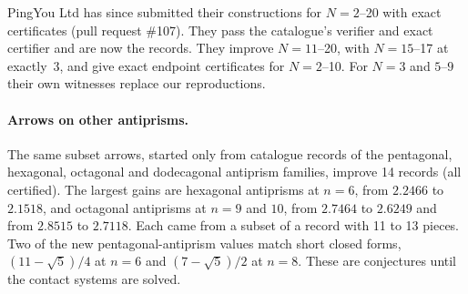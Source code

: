 \documentclass[11pt,a4paper]{article}
\theoremstyle{definition}
\theoremstyle{remark}
\begin{document}
PingYou Ltd has since submitted their constructions for $N=2$--20 with exact certificates (pull request \#107). They pass the catalogue's verifier and exact certifier and are now the records. They improve $N=11$--20, with $N=15$--17 at exactly~3, and give exact endpoint certificates for $N=2$--10. For $N=3$ and $5$--$9$ their own witnesses replace our reproductions.

\paragraph{Arrows on other antiprisms.} The same subset arrows, started only from catalogue records of the pentagonal, hexagonal, octagonal and dodecagonal antiprism families, improve 14 records (all certified). The largest gains are hexagonal antiprisms at $n=6$, from $2.2466$ to $2.1518$, and octagonal antiprisms at $n=9$ and $10$, from $2.7464$ to $2.6249$ and from $2.8515$ to $2.7118$. Each came from a subset of a record with 11 to 13 pieces. Two of the new pentagonal-antiprism values match short closed forms, $(11-\sqrt5)/4$ at $n=6$ and $(7-\sqrt5)/2$ at $n=8$. These are conjectures until the contact systems are solved.
\end{document}
